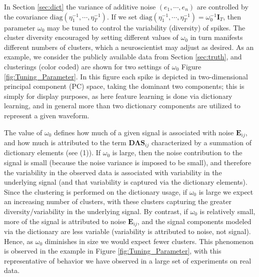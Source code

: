 \documentclass[journal]{IEEEtran}
\def\bf{\mathbf}
\newcommand{\Dmat}{{\bf D}}
\newcommand{\Emat}{{\bf E}}
\newcommand{\Imat}{{\bf I}}
\newcommand{\Smat}{{\bf S}}
\newcommand{\sv}{\boldsymbol{s}}
\newcommand{\Lambdamat}{\boldsymbol{\Lambda}}
\newcommand{\Omegamat}{\boldsymbol{\Omega}}
\begin{document}
In Section \ref{sec:dict} the variance of additive noise $(e_1,\cdots, e_n)$ are controlled by the covariance $\mbox{diag}(\eta_1^{-1},\cdots, \eta_T^{-1})$. If we set $\mbox{diag}(\eta_1^{-1},\cdots, \eta_T^{-1})=\omega_0^{-1}\Imat_T$, then parameter $\omega_0$ may be tuned to control the variability (diversity) of spikes. The cluster diversity encouraged by setting different values of $\omega_0$ in turn manifests different numbers of clusters, which a neuroscientist may adjust as desired. As an example, we consider the publicly available data from Section \ref{sec:truth}, and clusterings (color coded) are shown for two settings of $\omega_0$ Figure \ref{fig:Tuning_Parameter}. In this figure each spike is depicted in two-dimensional principal component (PC) space, taking the dominant two components; this is simply for display purposes, as here feature learning is done via dictionary learning, and in general more than two dictionary components are utilized to represent a given waveform.

The value of $\omega_0$ defines how much of a given signal is associated with noise $\Emat_{ij}$, and how much is attributed to the term $\Dmat\Lambdamat\Smat_{ij}$ characterized by a summation of dictionary elements (see (1)). If $\omega_0$ is large, then the noise contribution to the signal is small (because the noise variance is imposed to be small), and therefore the variability in the observed data is associated with variability in the underlying signal (and that variability is captured via the dictionary elements). Since the clustering is performed on the dictionary usage, if $\omega_0$ is large we expect an increasing number of clusters, with these clusters capturing the greater diversity/variability in the underlying signal. By contrast, if $\omega_0$ is relatively small, more of the signal is attributed to noise $\Emat_{ij}$, and the signal components modeled via the dictionary are less variable (variability is attributed to noise, not signal). Hence, as $\omega_0$ diminishes in size we would expect fewer clusters. This phenomenon is observed in the example in Figure \ref{fig:Tuning_Parameter}, with this representative of behavior we have observed in a large set of experiments on real data.
\end{document}
